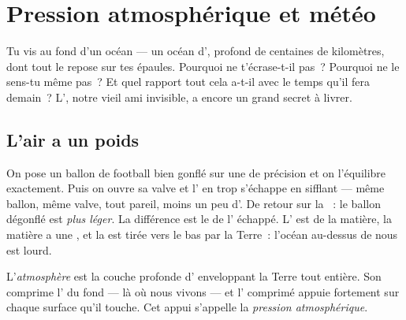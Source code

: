 \chapter{Pression atmosphérique et météo}\label{ch:g5:air-pressure-weather}

Tu vis au fond d'un océan --- un océan d', profond de centaines de
kilomètres, dont tout le  repose sur tes épaules. Pourquoi ne
t'écrase-t-il pas~? Pourquoi ne le sens-tu même pas~? Et quel rapport
tout cela a-t-il avec le temps qu'il fera demain~? L', notre vieil
ami invisible, a encore un grand secret à livrer.

\section{L'air a un poids}

\begin{example}\label{ex:g5:air-pressure-weather:weighing}
On pose un ballon de football bien gonflé sur une  de
précision et on l'équilibre exactement. Puis on ouvre sa valve et
l' en trop s'échappe en sifflant --- même ballon, même valve, tout
pareil, moins un peu d'. De retour sur la ~: le ballon
dégonflé est \emph{plus léger}. La différence est le  de l'
échappé. L' est de la matière, la matière a une , et la 
est tirée vers le bas par la Terre~: l'océan au-dessus de nous est
lourd.
\end{example}

\begin{definition}\label{def:g5:air-pressure-weather:pressure}
L'\emph{atmosphère} est la couche profonde d'
enveloppant la Terre tout entière. Son  comprime l' du
fond --- là où nous vivons --- et l' comprimé appuie fortement sur
chaque surface qu'il touche. Cet appui s'appelle la \emph{pression
atmosphérique}.
\end{definition}

